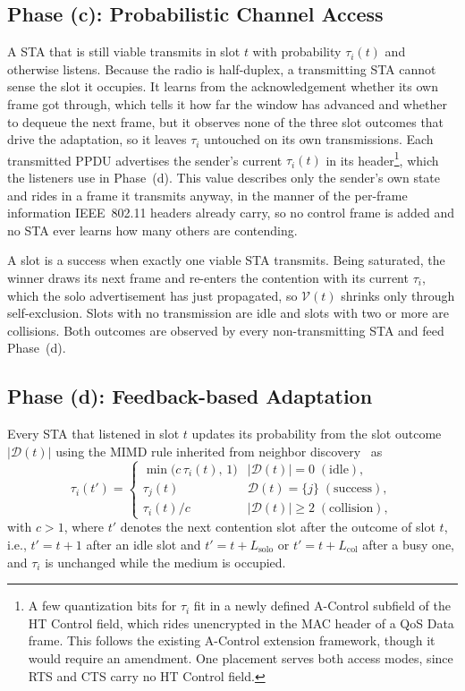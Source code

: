 \documentclass[journal,10pt]{IEEEtran}
\begin{document}
\subsection{Phase (c): Probabilistic Channel Access}
\label{subsec:channel_access}

A STA that is still viable transmits in slot $t$ with probability $\tau_i(t)$ and otherwise listens. Because the radio is half-duplex, a transmitting STA cannot sense the slot it occupies. It learns from the acknowledgement whether its own frame got through, which tells it how far the window has advanced and whether to dequeue the next frame, but it observes none of the three slot outcomes that drive the adaptation, so it leaves $\tau_i$ untouched on its own transmissions. Each transmitted PPDU advertises the sender's current $\tau_i(t)$ in its header\footnote{A few quantization bits for $\tau_i$ fit in a newly defined A-Control subfield of the HT Control field, which rides unencrypted in the MAC header of a QoS Data frame. This follows the existing A-Control extension framework, though it would require an amendment. One placement serves both access modes, since RTS and CTS carry no HT Control field.}, which the listeners use in Phase~(d). This value describes only the sender's own state and rides in a frame it transmits anyway, in the manner of the per-frame information IEEE~802.11 headers already carry, so no control frame is added and no STA ever learns how many others are contending.

A slot is a success when exactly one viable STA transmits. Being saturated, the winner draws its next frame and re-enters the contention with its current $\tau_i$, which the solo advertisement has just propagated, so $\mathcal{V}(t)$ shrinks only through self-exclusion. Slots with no transmission are idle and slots with two or more are collisions. Both outcomes are observed by every non-transmitting STA and feed Phase~(d).

\subsection{Phase (d): Feedback-based Adaptation}
\label{subsec:adaptive_control}

Every STA that listened in slot $t$ updates its probability from the slot outcome $|\mathcal{D}(t)|$ using the MIMD rule inherited from neighbor discovery~\cite{song2014pnd} as
\begin{equation}
\tau_i(t') =
\begin{cases}
\min\bigl(c\,\tau_i(t),\,1\bigr) & |\mathcal{D}(t)|=0\;(\text{idle}),\\[2pt]
\tau_j(t)              & \mathcal{D}(t)=\{j\}\;(\text{success}),\\[2pt]
\tau_i(t) / c          & |\mathcal{D}(t)|\ge 2\;(\text{collision}),
\end{cases}
\label{eq:mimd}
\end{equation}
with $c>1$, where $t'$ denotes the next contention slot after the outcome of slot $t$, i.e., $t'=t+1$ after an idle slot and $t'=t+L_\mathrm{solo}$ or $t'=t+L_\mathrm{col}$ after a busy one, and $\tau_i$ is unchanged while the medium is occupied. 
\end{document}
